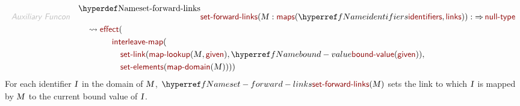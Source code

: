 \begin{align*}
  \KEY{Auxiliary Funcon} \quad
  & \NAMEDECL{set-forward-links}(
                       \VAR{M} : \NAMEHYPER{../../../Values/Composite}{Maps}{maps}
                                 (  \NAMEREF{identifiers}, 
                                        \NAMEHYPER{../.}{Linking}{links} )) 
    :  \TO \NAMEHYPER{../../../Values/Primitive}{Null}{null-type} \\&\quad
    \leadsto \NAMEHYPER{../.}{Flowing}{effect}
               ( \\&\quad\quad\quad\quad \NAMEHYPER{../.}{Giving}{interleave-map}
                       ( \\&\quad\quad\quad\quad\quad \NAMEHYPER{../.}{Linking}{set-link}
                               (  \NAMEHYPER{../../../Values/Composite}{Maps}{map-lookup}
                                       (  \VAR{M}, 
                                              \NAMEHYPER{../.}{Giving}{given} ), 
                                      \NAMEREF{bound-value}
                                       (  \NAMEHYPER{../.}{Giving}{given} ) ), \\&\quad\quad\quad\quad\quad
                              \NAMEHYPER{../../../Values/Composite}{Sets}{set-elements}
                               (  \NAMEHYPER{../../../Values/Composite}{Maps}{map-domain}
                                       (  \VAR{M} ) ) ) )
\end{align*}
For each identifier $\SHADE{\VAR{I}}$ in the domain of $\SHADE{\VAR{M}}$, $\SHADE{\NAMEREF{set-forward-links}
           (  \VAR{M} )}$ sets the 
  link to which $\SHADE{\VAR{I}}$ is mapped by $\SHADE{\VAR{M}}$ to the current bound value of $\SHADE{\VAR{I}}$.


